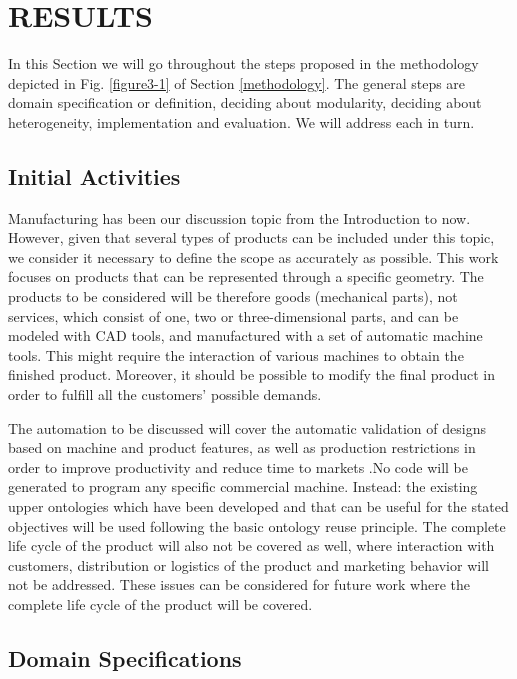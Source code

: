 \section{RESULTS}\label{chapter4}

In this Section we will go throughout the steps proposed in the methodology depicted in Fig. \ref{figure3-1} of Section \ref{methodology}. The general steps are domain specification or definition, deciding about modularity, deciding about heterogeneity, implementation and evaluation. We will address each in turn. 



\subsection{Initial Activities }\label{section4.1}

Manufacturing has been our discussion topic from the Introduction to now. However, given that several types of products can be included under this topic, we consider it necessary to define the scope as accurately as possible. This work  focuses on products that can be represented through a specific geometry. The products to be considered will be therefore goods (mechanical parts), not services, which consist of one, two or three-dimensional parts, and can be modeled with CAD tools, and manufactured with a set of automatic machine tools. This might require the interaction of various machines to obtain the finished product. Moreover, it should be possible to modify the final product in order to fulfill all the customers’ possible demands.

The automation to be discussed will cover the automatic validation of designs based on machine and product features, as well as production restrictions  in order to improve productivity and reduce time to markets \cite{dorr_cad-cam_1987}.No code will be generated to program any specific commercial machine. Instead: the existing upper ontologies which have been developed and that can be useful for the stated objectives will be used following the basic ontology reuse principle. The complete life cycle of the product will also not be covered as well, where  interaction with customers, distribution or logistics of the product and marketing behavior will not be addressed. These issues can be considered for future work where the complete life cycle of the product will be covered.

\subsection{Domain Specifications }\label{4.1.1}


